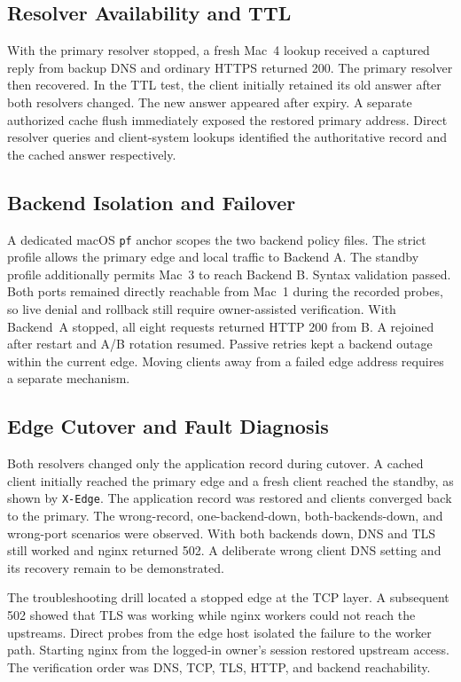 \documentclass[conference]{IEEEtran}
\begin{document}
\subsection{Resolver Availability and TTL}
With the primary resolver stopped, a fresh Mac~4 lookup received a captured
reply from backup DNS and ordinary HTTPS returned 200. The primary resolver
then recovered. In the TTL test, the client initially retained its old answer
after both resolvers changed. The new answer appeared after expiry. A separate
authorized cache flush immediately exposed the restored primary address.
Direct resolver queries and client-system lookups identified the authoritative
record and the cached answer respectively.

\subsection{Backend Isolation and Failover}
A dedicated macOS \texttt{pf} anchor scopes the two backend policy files. The
strict profile allows the primary edge and local traffic to Backend A. The
standby profile additionally permits Mac~3 to reach Backend B. Syntax
validation passed. Both ports remained directly reachable from Mac~1 during
the recorded probes, so live denial and rollback still require owner-assisted
verification. With Backend~A stopped, all eight requests returned HTTP 200
from B. A rejoined after restart and A/B rotation resumed. Passive retries
kept a backend outage within the current edge. Moving clients away from a
failed edge address requires a separate mechanism.

\subsection{Edge Cutover and Fault Diagnosis}
Both resolvers changed only the application record during cutover. A cached
client initially reached the primary edge and a fresh client reached the
standby, as shown by \texttt{X-Edge}. The application record was restored and
clients converged back to the primary. The wrong-record, one-backend-down,
both-backends-down, and wrong-port scenarios were observed. With both backends
down, DNS and TLS still worked and nginx returned 502. A deliberate wrong
client DNS setting and its recovery remain to be demonstrated.

The troubleshooting drill located a stopped edge at the TCP layer. A subsequent
502 showed that TLS was working while nginx workers could not reach the
upstreams. Direct probes from the edge host isolated the failure to the worker
path. Starting nginx from the logged-in owner's session restored upstream
access. The verification order was DNS, TCP, TLS, HTTP, and backend reachability.
\end{document}

